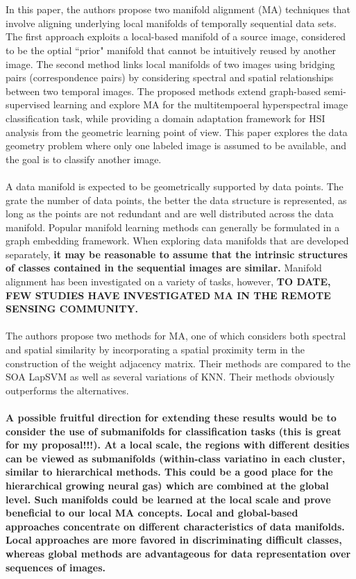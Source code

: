 \documentclass[]{article}
\begin{document}
		\\ \\
		In this paper, the authors propose two manifold alignment (MA) techniques that involve aligning underlying local manifolds of temporally sequential data sets.  The first approach exploits a local-based manifold of a source image, considered to be the optial ``prior" manifold that cannot be intuitively reused by another image.  The second method links local manifolds of two images using bridging pairs (correspondence pairs) by considering spectral and spatial relationships between two temporal images.  The proposed methods extend graph-based semi-supervised learning and explore MA for the multitempoeral hyperspectral image classification task, while providing a domain adaptation framework for HSI analysis from the geometric learning point of view.  This paper explores the data geometry problem where only one labeled image is assumed to be available, and the goal is to classify another image.		
		\\ \\
		A data manifold is expected to be geometrically supported by data points.  The grate the number of data points, the better the data structure is represented, as long as the points are not redundant and are well distributed across the data manifold.  Popular manifold learning methods can generally be formulated in a graph embedding framework.  When exploring data manifolds that are developed separately, \textbf{it may be reasonable to assume that the intrinsic structures of classes contained in the sequential images are similar.} Manifold alignment has been investigated on a variety of tasks, however, \textbf{TO DATE, FEW STUDIES HAVE INVESTIGATED MA IN THE REMOTE SENSING COMMUNITY.}
		\\ \\
		The authors propose two methods for MA, one of which considers both spectral and spatial similarity by incorporating a spatial proximity term in the construction of the weight adjacency matrix.  Their methods are compared to the SOA LapSVM as well as several variations of KNN.  Their methods obviously outperforms the alternatives.
		\\ \\
		\textbf{A possible fruitful direction for extending these results would be to consider the use of submanifolds for classification tasks (this is great for my proposal!!!).  At a local scale, the regions with different desities can be viewed as submanifolds (within-class variatino in each cluster, similar to hierarchical methods.  This could be a good place for the hierarchical growing neural gas) which are combined at the global level. Such manifolds could be learned at the local scale and prove beneficial to our local MA concepts.  Local and global-based approaches concentrate on different characteristics of data manifolds.  Local approaches are more  favored in discriminating difficult classes, whereas global methods are advantageous for data representation over sequences of images.} \\
		
\end{document}
